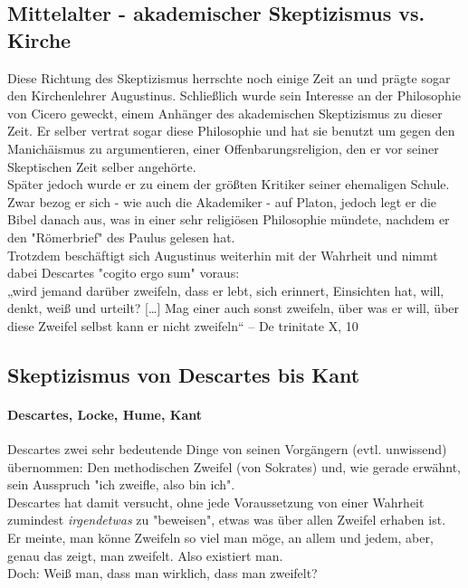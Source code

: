 \documentclass[12pt,a4paper]{article}
\begin{document}
	\subsection{Mittelalter - akademischer Skeptizismus vs. Kirche}
Diese Richtung des Skeptizismus herrschte noch einige Zeit an und prägte sogar den Kirchenlehrer Augustinus. Schließlich wurde sein Interesse an der Philosophie von Cicero geweckt, einem Anhänger des akademischen Skeptizismus zu dieser Zeit. Er selber vertrat sogar diese Philosophie und hat sie benutzt um gegen den Manichäismus zu argumentieren, einer Offenbarungsreligion, den er vor seiner Skeptischen Zeit selber angehörte.\\
Später jedoch wurde er zu einem der größten Kritiker seiner ehemaligen Schule. Zwar bezog er sich - wie auch die Akademiker - auf Platon, jedoch legt er die Bibel danach aus, was in einer sehr religiösen Philosophie mündete, nachdem er den "Römerbrief" des Paulus gelesen hat.\\
Trotzdem beschäftigt sich Augustinus weiterhin mit der Wahrheit und nimmt dabei Descartes "cogito ergo sum" voraus:\\
„wird jemand darüber zweifeln, dass er lebt, sich erinnert, Einsichten hat, will, denkt, weiß und urteilt? […] Mag einer auch sonst zweifeln, über was er will, über diese Zweifel selbst kann er nicht zweifeln“
– De trinitate X, 10%
	\subsection{Skeptizismus von Descartes bis Kant}
		\paragraph{Descartes, Locke, Hume, Kant}
Descartes zwei sehr bedeutende Dinge von seinen Vorgängern (evtl. unwissend) übernommen: Den methodischen Zweifel (von Sokrates) und, wie gerade erwähnt,  sein Ausspruch "ich zweifle, also bin ich".\\
Descartes hat damit versucht, ohne jede Voraussetzung von einer Wahrheit zumindest \emph{irgendetwas} zu "beweisen", etwas was über allen Zweifel erhaben ist.\\
Er meinte, man könne Zweifeln so viel man möge, an allem und jedem, aber, genau das zeigt, man zweifelt. Also existiert man.\\
Doch: Weiß man, dass man wirklich, dass man zweifelt?\\
\end{document}
